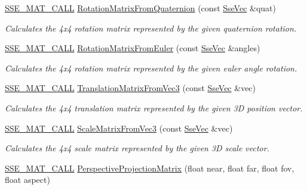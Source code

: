 \begin{DoxyCompactItemize}
\hyperlink{ssemat__math__defs_8h_a741f88d5589197d03fea9ab2b7622b8a}{S\+S\+E\+\_\+\+M\+A\+T\+\_\+\+C\+A\+L\+L} \hyperlink{namespacegofxmath_a786ee918eca59978387d6fce4dab5122}{Rotation\+Matrix\+From\+Quaternion} (const \hyperlink{namespacegofxmath_a634570ddcd2496053ee966227080e02f}{Sse\+Vec} \&quat)
\begin{DoxyCompactList}\small\item\em Calculates the 4x4 rotation matrix represented by the given quaternion rotation. \end{DoxyCompactList}\item 
\hyperlink{ssemat__math__defs_8h_a741f88d5589197d03fea9ab2b7622b8a}{S\+S\+E\+\_\+\+M\+A\+T\+\_\+\+C\+A\+L\+L} \hyperlink{namespacegofxmath_ac11c40e17108aa72d069b01b6a08bebf}{Rotation\+Matrix\+From\+Euler} (const \hyperlink{namespacegofxmath_a634570ddcd2496053ee966227080e02f}{Sse\+Vec} \&angles)
\begin{DoxyCompactList}\small\item\em Calculates the 4x4 rotation matrix represented by the given euler angle rotation. \end{DoxyCompactList}\item 
\hyperlink{ssemat__math__defs_8h_a741f88d5589197d03fea9ab2b7622b8a}{S\+S\+E\+\_\+\+M\+A\+T\+\_\+\+C\+A\+L\+L} \hyperlink{namespacegofxmath_a2b08e7c142f14df78883494d9c2f66e8}{Translation\+Matrix\+From\+Vec3} (const \hyperlink{namespacegofxmath_a634570ddcd2496053ee966227080e02f}{Sse\+Vec} \&vec)
\begin{DoxyCompactList}\small\item\em Calculates the 4x4 translation matrix represented by the given 3\+D position vector. \end{DoxyCompactList}\item 
\hyperlink{ssemat__math__defs_8h_a741f88d5589197d03fea9ab2b7622b8a}{S\+S\+E\+\_\+\+M\+A\+T\+\_\+\+C\+A\+L\+L} \hyperlink{namespacegofxmath_a7971ccb3a66b526ba72c66477539c923}{Scale\+Matrix\+From\+Vec3} (const \hyperlink{namespacegofxmath_a634570ddcd2496053ee966227080e02f}{Sse\+Vec} \&vec)
\begin{DoxyCompactList}\small\item\em Calculates the 4x4 scale matrix represented by the given 3\+D scale vector. \end{DoxyCompactList}\item 
\hyperlink{ssemat__math__defs_8h_a741f88d5589197d03fea9ab2b7622b8a}{S\+S\+E\+\_\+\+M\+A\+T\+\_\+\+C\+A\+L\+L} \hyperlink{namespacegofxmath_a701f5bfeb4c0c0d4b080a9ad00f910ce}{Perspective\+Projection\+Matrix} (float near, float far, float fov, float aspect)

\end{DoxyCompactItemize}
